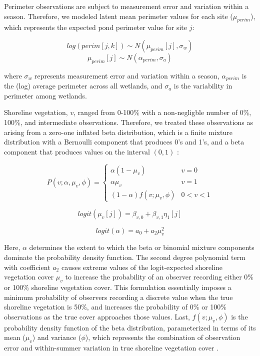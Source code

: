 Perimeter observations are subject to measurement error and variation
within a season. Therefore, we modeled latent mean perimeter values for
each site ($\mu_{perim}$), which represents the expected pond perimeter
value for site $j$:

\[ log(perim[j, k]) \sim N(\mu_{perim}[j], \sigma_{w}) \]
\[ \mu_{perim}[j] \sim N(\alpha_{perim}, \sigma_{a}) \]

where $\sigma_{w}$ represents measurement error and variation within a
season, $\alpha_{perim}$ is the (log) average perimeter across all
wetlands, and $\sigma_{a}$ is the variability in perimeter among
wetlands.

Shoreline vegetation, $v$, ranged from 0-100\% with a non-negligble
number of 0\%, 100\%, and intermediate observations. Therefore, we
treated these observations as arising from a zero-one inflated beta
distribution, which is a finite mixture distribution with a Bernoulli
component that produces 0's and 1's, and a beta component that produces
values on the interval $(0, 1)$ \citep{Ospina2012}:

\[
P(v; \alpha, \mu_{v}, \phi) = \left\{
  \begin{array}{lr}
    \alpha(1 - \mu_{v}) &  v = 0\\
    \alpha \mu_{v} &  v = 1\\
    (1 - \alpha)f(v; \mu_{v}, \phi) &  0 < v < 1
  \end{array}
\right.
\]

\[ logit(\mu_{v}[j]) = \beta_{v, 0} + \beta_{v, 1} \eta_1[j] \]

\[ logit(\alpha) = a_0 + a_2 \mu_v^2 \]

Here, $\alpha$ determines the extent to which the beta or binomial
mixture components dominate the probability density function. The second
degree polynomial term with coefficient $a_2$ causes extreme values of
the logit-expected shoreline vegetation cover $\mu_v$ to increase the
probability of an observer recording either 0\% or 100\% shoreline
vegetation cover. This formulation essentially imposes a minimum
probability of observers recording a discrete value when the true
shoreline vegetation is 50\%, and increases the probability of 0\% or
100\% observations as the true cover approaches those values. Last,
$f(v; \mu_{v}, \phi)$ is the probability density function of the beta
distribution, parameterized in terms of its mean ($\mu_v$) and variance
($\phi$), which represents the combination of observation error and
within-summer variation in true shoreline vegetation cover \citep{Ospina2012}.

